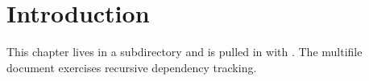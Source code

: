 \section{Introduction}
This chapter lives in a subdirectory and is pulled in with \verb||.
The multifile document exercises recursive dependency tracking.
